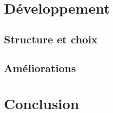 \documentclass[a4paper]{article}
\begin{document}

\section{Développement}

\subsection{Structure et choix}

\subsection{Améliorations}





\section{Conclusion}
\end{document}
